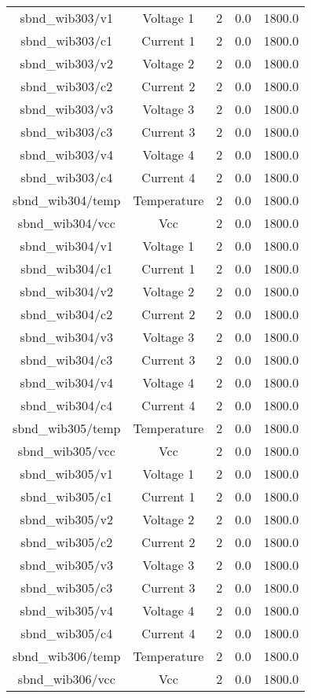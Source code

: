 \begin{table}[ptb]
\begin{tabular}{c | c c c c}
sbnd_wib303/v1 & Voltage 1 & 2 & 0.0 & 1800.0\\ 
sbnd_wib303/c1 & Current 1 & 2 & 0.0 & 1800.0\\ 
sbnd_wib303/v2 & Voltage 2 & 2 & 0.0 & 1800.0\\ 
sbnd_wib303/c2 & Current 2 & 2 & 0.0 & 1800.0\\ 
sbnd_wib303/v3 & Voltage 3 & 2 & 0.0 & 1800.0\\ 
sbnd_wib303/c3 & Current 3 & 2 & 0.0 & 1800.0\\ 
sbnd_wib303/v4 & Voltage 4 & 2 & 0.0 & 1800.0\\ 
sbnd_wib303/c4 & Current 4 & 2 & 0.0 & 1800.0\\ 
sbnd_wib304/temp & Temperature & 2 & 0.0 & 1800.0\\ 
sbnd_wib304/vcc & Vcc & 2 & 0.0 & 1800.0\\ 
sbnd_wib304/v1 & Voltage 1 & 2 & 0.0 & 1800.0\\ 
sbnd_wib304/c1 & Current 1 & 2 & 0.0 & 1800.0\\ 
sbnd_wib304/v2 & Voltage 2 & 2 & 0.0 & 1800.0\\ 
sbnd_wib304/c2 & Current 2 & 2 & 0.0 & 1800.0\\ 
sbnd_wib304/v3 & Voltage 3 & 2 & 0.0 & 1800.0\\ 
sbnd_wib304/c3 & Current 3 & 2 & 0.0 & 1800.0\\ 
sbnd_wib304/v4 & Voltage 4 & 2 & 0.0 & 1800.0\\ 
sbnd_wib304/c4 & Current 4 & 2 & 0.0 & 1800.0\\ 
sbnd_wib305/temp & Temperature & 2 & 0.0 & 1800.0\\ 
sbnd_wib305/vcc & Vcc & 2 & 0.0 & 1800.0\\ 
sbnd_wib305/v1 & Voltage 1 & 2 & 0.0 & 1800.0\\ 
sbnd_wib305/c1 & Current 1 & 2 & 0.0 & 1800.0\\ 
sbnd_wib305/v2 & Voltage 2 & 2 & 0.0 & 1800.0\\ 
sbnd_wib305/c2 & Current 2 & 2 & 0.0 & 1800.0\\ 
sbnd_wib305/v3 & Voltage 3 & 2 & 0.0 & 1800.0\\ 
sbnd_wib305/c3 & Current 3 & 2 & 0.0 & 1800.0\\ 
sbnd_wib305/v4 & Voltage 4 & 2 & 0.0 & 1800.0\\ 
sbnd_wib305/c4 & Current 4 & 2 & 0.0 & 1800.0\\ 
sbnd_wib306/temp & Temperature & 2 & 0.0 & 1800.0\\ 
sbnd_wib306/vcc & Vcc & 2 & 0.0 & 1800.0\\ 

\end{tabular}
\end{table}
